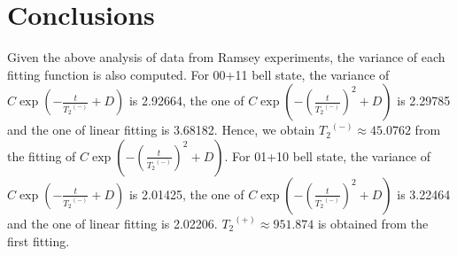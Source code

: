 \documentclass[letterpaper]{article}
\numberwithin{equation}{section} %
\numberwithin{figure}{section} %
\numberwithin{table}{section} %
\begin{document}

\section{Conclusions}
Given the above analysis of data from Ramsey experiments, the variance of each fitting function is also computed. For 00+11 bell state, the variance of $C \exp(- \frac{t}{{T_2}^{(-)}}+D)$ is 2.92664, the one of $C \exp(- (\frac{t}{{T_2}^{(-)}})^2+D)$ is 2.29785 and the one of linear fitting is 3.68182. Hence, we obtain ${T_2}^{(-)} \approx 45.0762$ from the fitting of $C \exp(- (\frac{t}{{T_2}^{(-)}})^2+D)$. For 01+10 bell state, the variance of $C \exp(- \frac{t}{{T_2}^{(-)}}+D)$ is 2.01425, the one of $C \exp(- (\frac{t}{{T_2}^{(-)}})^2+D)$ is 3.22464 and the one of linear fitting is 2.02206. ${T_2}^{(+)} \approx 951.874$ is obtained from the first fitting. 
\end{document}

